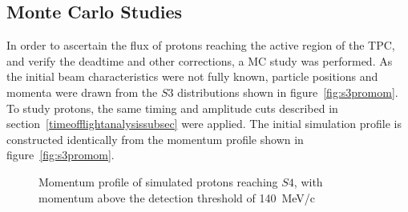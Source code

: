 \subsection{Monte Carlo Studies}
In order to ascertain the flux of protons reaching the active region of the TPC, and verify the deadtime and other corrections, a MC study was performed. 
As the initial beam characteristics were not fully known, particle positions and momenta were drawn from the $\mathit{S3}$ distributions shown in figure~\ref{fig:s3promom}. To study protons, the same timing and amplitude cuts described in section~\ref{timeofflightanalysissubsec} were applied.
The initial simulation profile is constructed identically from the momentum profile shown in figure~\ref{fig:s3promom}.

\begin{figure}[ht]
  \centering
     \begin{adjustbox}{max totalsize={\textwidth}{.35\textheight}, center}
      
    \end{adjustbox}
    \caption{Momentum profile of simulated protons reaching $\mathit{S4}$, with momentum above the detection threshold of 140~MeV/c}
    \label{fig:MCS4}
\end{figure}



%      

